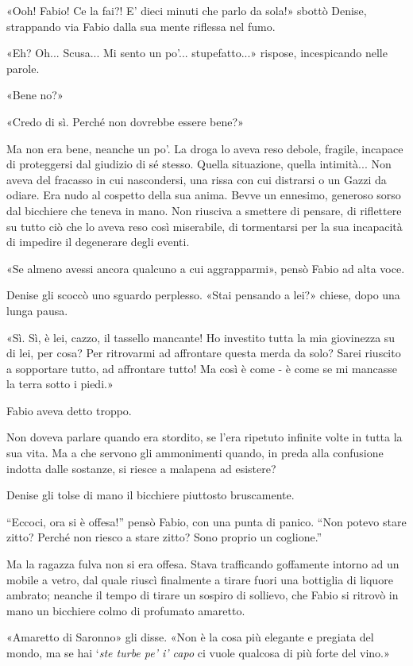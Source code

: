 «Ooh! Fabio! Ce la fai?! E' dieci minuti che parlo da sola!» sbottò Denise, strappando via Fabio dalla sua mente riflessa nel fumo.

«Eh? Oh... Scusa... Mi sento un po'... stupefatto...» rispose, incespicando nelle parole.

«Bene no?»

«Credo di sì. Perché non dovrebbe essere bene?»

Ma non era bene, neanche un po'. La droga lo aveva reso debole, fragile, incapace di proteggersi dal giudizio di sé stesso. Quella situazione, quella intimità... Non aveva del fracasso in cui nascondersi, una rissa con cui distrarsi o un Gazzi da odiare. Era nudo al cospetto della sua anima. Bevve un ennesimo, generoso sorso dal bicchiere che teneva in mano. Non riusciva a smettere di pensare, di riflettere su tutto ciò che lo aveva reso così miserabile, di tormentarsi per la sua incapacità di impedire il degenerare degli eventi.

«Se almeno avessi ancora qualcuno a cui aggrapparmi», pensò Fabio ad alta voce.

Denise gli scoccò uno sguardo perplesso. «Stai pensando a lei?» chiese, dopo una lunga pausa.

«Sì. Sì, è lei, cazzo, il tassello mancante! Ho investito tutta la mia giovinezza su di lei, per cosa? Per ritrovarmi ad affrontare questa merda da solo? Sarei riuscito a sopportare tutto, ad affrontare tutto! Ma così è come - è come se mi mancasse la terra sotto i piedi.»

Fabio aveva detto troppo.

Non doveva parlare quando era stordito, se l'era ripetuto infinite volte in tutta la sua vita. Ma a che servono gli ammonimenti quando, in preda alla confusione indotta dalle sostanze, si riesce a malapena ad esistere?

Denise gli tolse di mano il bicchiere piuttosto bruscamente.

``Eccoci, ora si è offesa!'' pensò Fabio, con una punta di panico. ``Non potevo stare zitto? Perché non riesco a stare zitto? Sono proprio un coglione.''

Ma la ragazza fulva non si era offesa. Stava trafficando goffamente intorno ad un mobile a vetro, dal quale riuscì finalmente a tirare fuori una bottiglia di liquore ambrato; neanche il tempo di tirare un sospiro di sollievo, che Fabio si ritrovò in mano un bicchiere colmo di profumato amaretto.

«Amaretto di Saronno» gli disse. «Non è la cosa più elegante e pregiata del mondo, ma se hai `\emph{ste turbe pe' i' capo} ci vuole qualcosa di più forte del vino.»

